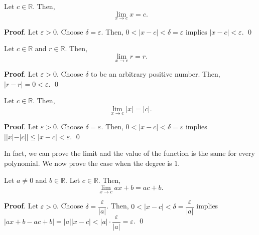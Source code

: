 \documentclass[11pt]{book}
\theoremstyle{break}
\theoremstyle{no_label}
\newcommand{\bbR}{\mathbb{R}}
\numberwithin{equation}{section}
\begin{document}
\begin{proposition}
    Let $c\in\bbR$. Then, $$\lim_{x\to c}x=c.$$
\end{proposition}
\textbf{Proof}. Let $\varepsilon>0$. Choose $\delta=\varepsilon$. Then, $0<|x-c|<\delta=\varepsilon$ implies $|x-c|<\varepsilon$. \qed

\begin{proposition}
    Let $c\in\bbR$ and $r\in\bbR$. Then, $$\lim_{x\to c}r=r.$$
\end{proposition}
\textbf{Proof}. Let $\varepsilon>0$. Choose $\delta$ to be an arbitrary positive number. Then, $|r-r|=0<\varepsilon$. \qed

\begin{proposition}
    Let $c\in\bbR$. Then, $$\lim_{x\to c}|x|=|c|.$$
\end{proposition}
\textbf{Proof}. Let $\varepsilon>0$. Choose $\delta=\varepsilon$. Then, $0<|x-c|<\delta=\varepsilon$ implies $||x|-|c||\leq|x-c|<\varepsilon$. \qed

In fact, we can prove the limit and the value of the function is the same for every polynomial. We now prove the case when the degree is $1$.

\begin{proposition}
    Let $a\ne 0$ and $b\in\bbR$. Let $c\in\bbR$. Then, $$\lim_{x\to c}ax+b=ac+b.$$
\end{proposition}
\textbf{Proof}. Let $\varepsilon>0$. Choose $\delta=\dfrac{\varepsilon}{|a|}$. Then, $0<|x-c|<\delta=\dfrac{\varepsilon}{|a|}$ implies $|ax+b-ac+b|=|a||x-c|<|a|\cdot\dfrac{\varepsilon}{|a|}=\varepsilon$. \qed
\end{document}
